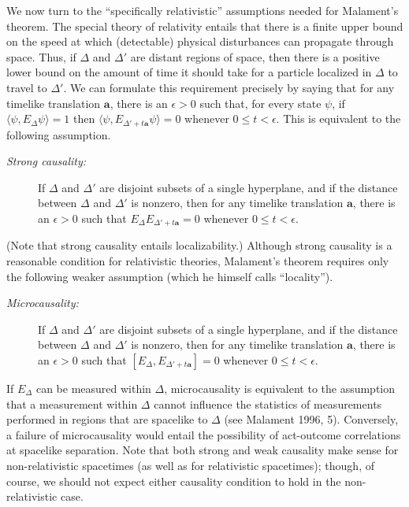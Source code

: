 \documentclass[11pt]{article}
\theoremstyle{remark}
\begin{document}
We now turn to the ``specifically relativistic'' assumptions needed
for Malament's theorem.  The special theory of relativity entails that
there is a finite upper bound on the speed at which (detectable)
physical disturbances can propagate through space.  Thus, if $\Delta$
and $\Delta '$ are distant regions of space, then there is a positive
lower bound on the amount of time it should take for a particle
localized in $\Delta$ to travel to $\Delta'$.  We can formulate this
requirement precisely by saying that for any timelike translation
$\mathbf{a}$, there is an $\epsilon >0$ such that, for every state
$\psi$, if $\langle \psi ,E_{\Delta}\psi \rangle =1$ then $\langle
\psi ,E_{\Delta '+t\mathbf{a}}\psi \rangle =0$ whenever $0\leq
t<\epsilon$.  This is equivalent to the following assumption.
\begin{description}
\item[{\it Strong causality:}] If $\Delta$ and $\Delta '$ are disjoint
  subsets of a single hyperplane, and if the distance between $\Delta$
  and $\Delta '$ is nonzero, then for any timelike translation
  $\mathbf{a}$, there is an $\epsilon >0$ such that
  $E_{\Delta}E_{\Delta '+t\mathbf{a}}=0$ whenever $0\leq t<\epsilon$.
\end{description} (Note that strong causality entails localizability.)
Although strong causality is a reasonable condition for relativistic
theories, Malament's theorem requires only the following weaker
assumption (which he himself calls ``locality'').
\begin{description}
\item[{\it Microcausality:}] If $\Delta$ and $\Delta '$ are disjoint
  subsets of a single hyperplane, and if the distance between $\Delta$
  and $\Delta '$ is nonzero, then for any timelike translation
  $\mathbf{a}$, there is an $\epsilon >0$ such that
  $[E_{\Delta},E_{\Delta '+t\mathbf{a}}]=0$ whenever $0\leq
  t<\epsilon$.  \end{description} If $E_{\Delta}$ can be measured
within $\Delta$, microcausality is equivalent to the assumption that a
measurement within $\Delta$ cannot influence the statistics of
measurements performed in regions that are spacelike to $\Delta$ (see
Malament 1996, 5).  Conversely, a failure of microcausality would
entail the possibility of act-outcome correlations at spacelike
separation.  Note that both strong and weak causality make sense for
non-relativistic spacetimes (as well as for relativistic spacetimes);
though, of course, we should not expect either causality condition to
hold in the non-relativistic case.
\end{document}
